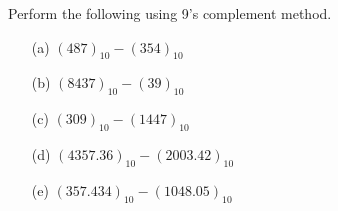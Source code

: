 \begin{problem}\label{prob5.43}
Perform the following using 9's complement method.
\begin{itemize}
\item[(a)] $(487)_{10}-(354)_{10}$

\item[(b)] $(8437)_{10}-(39)_{10}$

\item[(c)] $(309)_{10}-(1447)_{10}$

\item[(d)] $(4357.36)_{10}-(2003.42)_{10}$

\item[(e)] $(357.434)_{10}-(1048.05)_{10}$
\end{itemize}
\end{problem}

